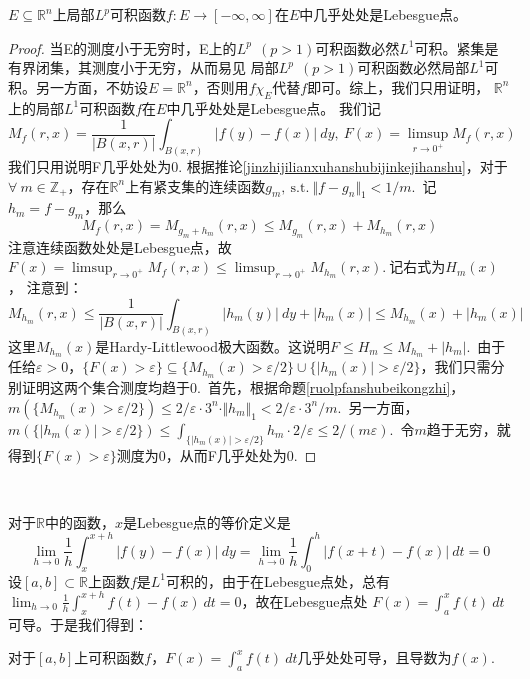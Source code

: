 \documentclass[color=green,thmcnt=section,lang=cn,12pt]{elegantbook}
\numberwithin{equation}{section}%
\numberwithin{figure}{section}%
\newcommand{\RR}{\mathbb{R}}
\renewcommand{\RN}{\RR^n}
\newcommand{\ZZ}{\mathbb{Z}}
\newcommand{\ee}{\varepsilon}
\newcommand{\any}{\forall \ }
\newcommand{\sothat}{\ \textrm{s.t.}\ }
\newcommand{\normp}[2]{\Vert #1 \Vert_{#2}}
\begin{document}
\begin{theorem}[Lebesgue微分定理]\label{lebesgueweifendingli}
    $E\subseteq \RN$上局部$L^p$可积函数$f:E\to[-\infty,\infty]$在$E$中几乎处处是Lebesgue点。
\end{theorem}
\begin{proof}
    当E的测度小于无穷时，E上的$L^p\ \ (p>1)$可积函数必然$L^1$可积。紧集是有界闭集，其测度小于无穷，从而易见
    局部$L^p\ \ (p>1)$可积函数必然局部$L^1$可积。另一方面，不妨设$E=\RN$，否则用$f\chi_E$代替$f$即可。综上，我们只用证明，
    $\RN$上的局部$L^1$可积函数$f$在$E$中几乎处处是Lebesgue点。
我们记\begin{equation*}
    M_f(r,x)=\frac{1}{|B(x,r)|}\int_{B(x,r)}|f(y)-f(x)|\ dy,\ F(x)=\limsup_{r\to 0^+}M_f(r,x)
\end{equation*}
我们只用说明F几乎处处为0.
    根据推论\ref{jinzhijilianxuhanshubijinkejihanshu}，对于$\any m\in \ZZ_+$，存在$\RN$上有紧支集的连续函数$g_m,\sothat \normp{f-g_n}{1}<1/m$.\ 
    记$h_m=f-g_m$，那么
    \begin{equation*}
        M_f(r,x)=M_{g_m+h_m}(r,x)\leq M_{g_m}(r,x)+M_{h_m}(r,x)
    \end{equation*}注意连续函数处处是Lebesgue点，故
    $F(x)=\limsup_{r\to 0^+}M_f(r,x)\leq \limsup_{r\to 0^+}M_{h_m}(r,x).\ $记右式为$H_m(x)$，
    注意到：\begin{equation*}
        M_{h_m}(r,x)\leq \frac{1}{|B(x,r)|}\int_{B(x,r)}|h_m(y)|\ dy+|h_m(x)|\leq M_{h_m}(x)+|h_m(x)|
    \end{equation*}
    这里$M_{h_m}(x)$是Hardy-Littlewood极大函数。这说明$F\leq H_m\leq M_{h_m}+|h_m|$.\ 由于任给$\ee>0$，$\{F(x)>\ee\}\subseteq \{M_{h_m}(x)>\ee/2\}\cup\{|h_m(x)|>\ee/2\}$，我们只需分别证明这两个集合测度均趋于0.\ 
    首先，根据命题\ref{ruolpfanshubeikongzhi}，$m(\{M_{h_m}(x)>\ee/2\})\leq 2/\ee\cdot 3^n\cdot \normp{h_m}{1}<2/\ee\cdot 3^n/m$.\ 另一方面，
    $m(\{|h_m(x)|>\ee/2\})\leq \int_{\{|h_m(x)|>\ee/2\}}h_m\cdot 2/\ee\leq 2/(m\ee)$.\ 令$m$趋于无穷，就得到$\{F(x)>\ee\}$测度为0，从而F几乎处处为0.
\end{proof}
\ 

对于$\RR$中的函数，$x$是Lebesgue点的等价定义是\begin{equation*}
    \lim_{h\to 0}\frac{1}{h}\int_{x}^{x+h}|f(y)-f(x)|\ dy=\lim_{h\to 0}\frac{1}{h}\int_{0}^{h}|f(x+t)-f(x)|\ dt=0
\end{equation*}
设$[a,b]\subset \RR$上函数$f$是$L^1$可积的，由于在Lebesgue点处，总有$\lim_{h\to 0}\frac{1}{h}\int_{x}^{x+h}f(t)-f(x)\ dt=0$，故在Lebesgue点处
$F(x)=\int_{a}^{x}f(t)\ dt$可导。于是我们得到：
\begin{theorem}\label{jifendedaoshu}
    对于$[a,b]$上可积函数$f$，$F(x)=\int_{a}^{x}f(t)\ dt$几乎处处可导，且导数为$f(x)$.
\end{theorem}
\end{document}
